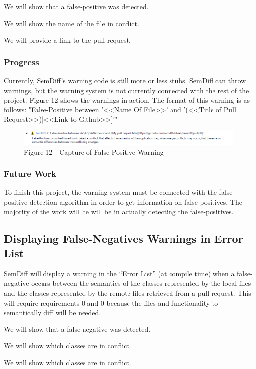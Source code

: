 \documentclass[10pt,draftclsnofoot,onecolumn]{IEEEtran}
\begin{document}
We will show that a false-positive was detected.

We will show the name of the file in conflict.

We will provide a link to the pull request.

\subsubsection{Progress}
Currently, SemDiff’s warning code is still more or less stubs. SemDiff can throw warnings, but the warning system is not currently connected with the rest of the project. 
Figure 12 shows the warnings in action. The format of this warning is as follows:
"False-Positive between '<<Name Of File>>' and '(<<Title of Pull Request>>)[<<Link to Github>>]'"

\begin{figure}[h!]
	\includegraphics[width=\linewidth]{falsePositiveWarning.png}
	\caption*{Figure 12 - Capture of False-Positive Warning}
\end{figure}

\subsubsection{Future Work}
To finish this project, the warning system must be connected with the false-positive detection algorithm in order to get information on false-positives. The majority of the work will be will be in actually detecting the false-positives.

\subsection{Displaying False-Negatives Warnings in Error List}
SemDiff will display a warning in the “Error List” (at compile time) when a false-negative occurs between the semantics of the classes represented by the local files and the classes represented by the remote files retrieved from a pull request. This will require requirements 0 and 0 because the files and functionality to semantically diff will be needed.

We will show that a false-negative was detected.

We will show which classes are in conflict.

We will show which classes are in conflict.
\end{document}
